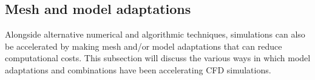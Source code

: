



\subsection{Mesh and model adaptations}
\label{subsect: meshandmodel}
Alongside alternative numerical and algorithmic techniques, simulations can also be accelerated by making mesh and/or model adaptations that can reduce computational costs. This subsection will discuss the various ways in which model adaptations and combinations have been accelerating CFD simulations.

